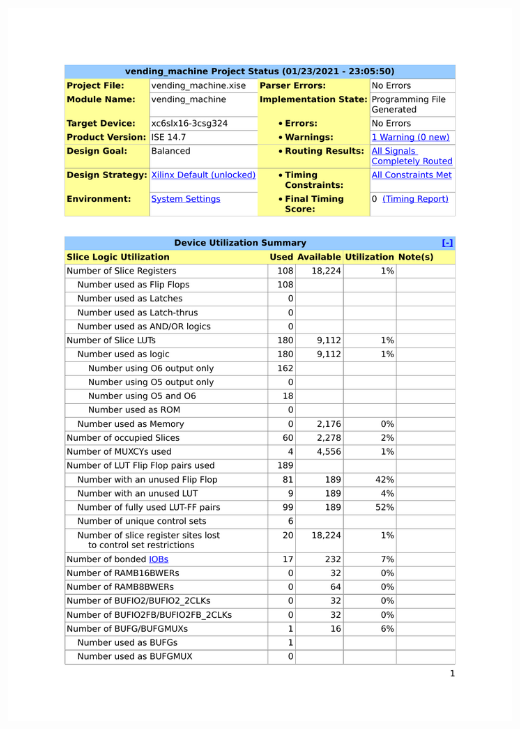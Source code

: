 \documentclass{article}
\begin{document}
{\centering\includegraphics[scale=0.8, page=2]{../figs/design_summary.pdf}\par}
\end{document}
